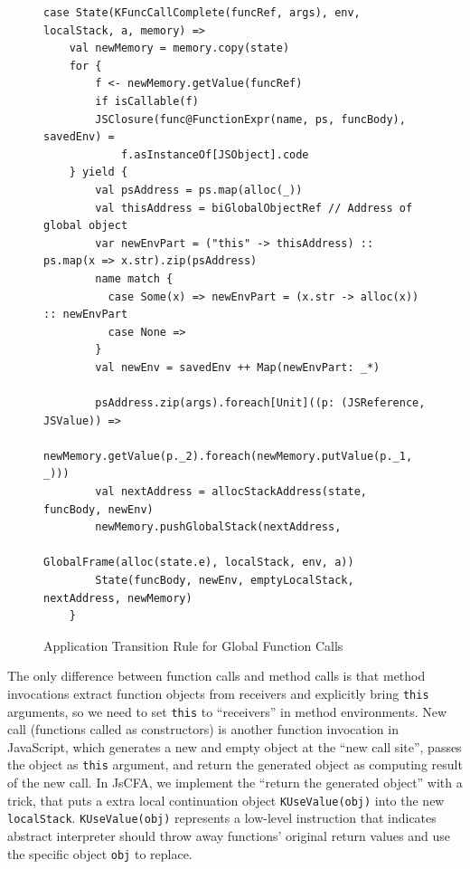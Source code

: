 \documentclass{article}
\begin{document}
\begin{figure}
  \lstset{language=Scala}
  \begin{lstlisting}
case State(KFuncCallComplete(funcRef, args), env, localStack, a, memory) =>
    val newMemory = memory.copy(state)
    for {
        f <- newMemory.getValue(funcRef)
        if isCallable(f)
        JSClosure(func@FunctionExpr(name, ps, funcBody), savedEnv) =
            f.asInstanceOf[JSObject].code
    } yield {
        val psAddress = ps.map(alloc(_))
        val thisAddress = biGlobalObjectRef // Address of global object
        var newEnvPart = ("this" -> thisAddress) :: ps.map(x => x.str).zip(psAddress)
        name match {
          case Some(x) => newEnvPart = (x.str -> alloc(x)) :: newEnvPart
          case None =>
        }
        val newEnv = savedEnv ++ Map(newEnvPart: _*)

        psAddress.zip(args).foreach[Unit]((p: (JSReference, JSValue)) =>
          newMemory.getValue(p._2).foreach(newMemory.putValue(p._1, _)))
        val nextAddress = allocStackAddress(state, funcBody, newEnv)
        newMemory.pushGlobalStack(nextAddress,
                                  GlobalFrame(alloc(state.e), localStack, env, a))
        State(funcBody, newEnv, emptyLocalStack, nextAddress, newMemory)
    }

  \end{lstlisting}
  \caption{Application Transition Rule for Global Function Calls}
\label{fig:app-call}
\end{figure}

The only difference between function calls and method calls is that method invocations extract function objects from receivers and explicitly bring \verb|this| arguments, so we need to set \verb|this| to ``receivers'' in method environments.
New call (functions called as constructors) is another function invocation in JavaScript, which generates a new and empty object at the ``new call site'', passes the object as \verb|this| argument, and return the generated object as computing result of the new call. In JsCFA, we implement the ``return the generated object'' with a trick, that puts a extra local continuation object \verb|KUseValue(obj)| into the new \verb|localStack|.
\verb|KUseValue(obj)| represents a low-level instruction that indicates abstract interpreter should throw away functions' original return values and use the specific object \verb|obj| to replace.
\end{document}
